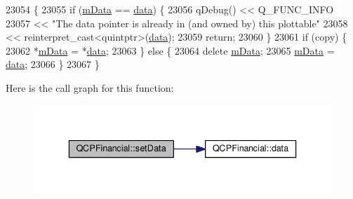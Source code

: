 \begin{DoxyCode}
23054                                                                \{
23055   \textcolor{keywordflow}{if} (\hyperlink{class_q_c_p_financial_a475f63587ca1077d8c30aaf2b71ae026}{mData} == \hyperlink{class_q_c_p_financial_a58e05aefa057d16edfcc0334cf81c241}{data}) \{
23056     qDebug() << Q\_FUNC\_INFO
23057              << \textcolor{stringliteral}{"The data pointer is already in (and owned by) this plottable"}
23058              << \textcolor{keyword}{reinterpret\_cast<}quintptr\textcolor{keyword}{>}(\hyperlink{class_q_c_p_financial_a58e05aefa057d16edfcc0334cf81c241}{data});
23059     \textcolor{keywordflow}{return};
23060   \}
23061   \textcolor{keywordflow}{if} (copy) \{
23062     *\hyperlink{class_q_c_p_financial_a475f63587ca1077d8c30aaf2b71ae026}{mData} = *\hyperlink{class_q_c_p_financial_a58e05aefa057d16edfcc0334cf81c241}{data};
23063   \} \textcolor{keywordflow}{else} \{
23064     \textcolor{keyword}{delete} \hyperlink{class_q_c_p_financial_a475f63587ca1077d8c30aaf2b71ae026}{mData};
23065     \hyperlink{class_q_c_p_financial_a475f63587ca1077d8c30aaf2b71ae026}{mData} = \hyperlink{class_q_c_p_financial_a58e05aefa057d16edfcc0334cf81c241}{data};
23066   \}
23067 \}
\end{DoxyCode}


Here is the call graph for this function\+:\nopagebreak
\begin{figure}[H]
\begin{center}
\leavevmode
\includegraphics[width=336pt]{class_q_c_p_financial_adf12a86082f1e488df6a4e8603f8fd6d_cgraph}
\end{center}
\end{figure}


\hypertarget{class_q_c_p_financial_a886881339d6447432af55adaad748c3c}{}
